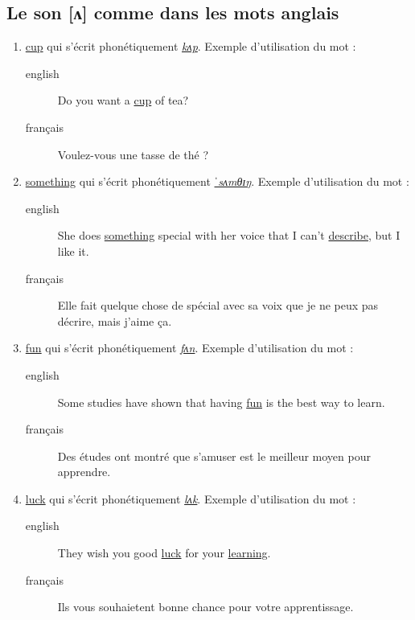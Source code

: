 \documentclass[12pt,a4paper]{book}
\begin{document}
\subsection{Le son [ʌ] comme dans les mots anglais}
\label{sec:org2b5aca8}
\begin{enumerate}
\item \href{http://www.wordreference.com/enfr/cup}{cup} qui s'écrit phonétiquement \href{https://en.oxforddictionaries.com/definition/cup}{\emph{kʌp}}. Exemple d'utilisation du mot :
\begin{description}
\item[{english}] \textenglish{Do you want a \href{https://youtu.be/pjcOzqxu4JQ}{cup} of tea?}
\item[{français}] Voulez-vous une tasse de thé ?
\end{description}
\item \href{http://www.wordreference.com/enfr/something}{something} qui s'écrit phonétiquement \href{https://en.oxforddictionaries.com/definition/something}{\emph{ˈsʌmθɪŋ}}. Exemple d'utilisation du mot : 
\begin{description}
\item[{english}] \textenglish{She does \href{https://youtu.be/UelDrZ1aFeY}{something} special with her voice that I can't
\href{https://genius.com/The-beatles-something-lyrics}{describe}, but I like it.}
\item[{français}] Elle fait quelque chose de spécial avec sa voix que
je ne peux pas décrire, mais j'aime ça.
\end{description}
\item \href{http://www.wordreference.com/enfr/fun}{fun} qui s'écrit phonétiquement \href{https://en.oxforddictionaries.com/definition/fun}{\emph{fʌn}}. Exemple d'utilisation du mot : 
\begin{description}
\item[{english}] \textenglish{Some studies have shown that having \href{https://youtu.be/KXJNoC6CuYE}{fun} is the best
way to learn.}
\item[{français}] Des études ont montré que s'amuser est le meilleur
moyen pour apprendre.
\end{description}
\item \href{http://www.wordreference.com/enfr/luck}{luck} qui s'écrit phonétiquement \href{https://en.oxforddictionaries.com/definition/luck}{\emph{lʌk}}. Exemple d'utilisation du mot :
\begin{description}
\item[{english}] \textenglish{They wish you good \href{https://youtu.be/LQCY2zL0Jr8}{luck} for your \href{https://youtu.be/o61dD6hwrdM}{learning}.}
\item[{français}] Ils vous souhaietent bonne chance pour votre
apprentissage.
\end{description}
\end{enumerate}
\end{document}
